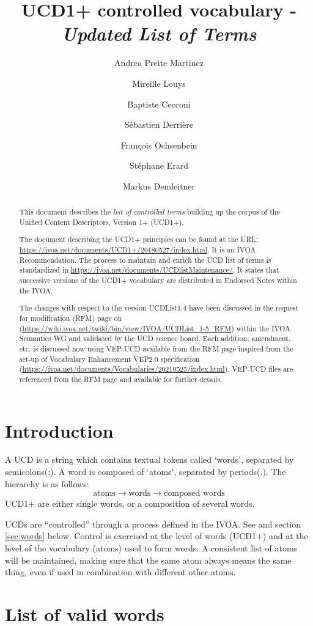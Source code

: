 \documentclass[11pt,a4paper]{ivoa}
\title{UCD1+ controlled vocabulary - \emph{Updated List of Terms}}
\author{Andrea Preite Martinez}
\author{Mireille Louys}
\author{Baptiste Cecconi}
\author{S\'ebastien Derri\`ere}
\author{Fran\c cois Ochsenbein}
\author{St\'ephane Erard}
\author{Markus Demleitner}
\begin{document}
\begin{abstract}
This document describes the \emph{list of controlled terms}  building up the corpus of the Unified Content Descriptors, Version 1+ (UCD1+). 

The document describing the UCD1+ principles can be found at the URL: \url{https://ivoa.net/documents/UCD1+/20180527/index.html}. 
It is an IVOA Recommendation. 
The process to maintain and enrich the UCD list of terms is standardized in  \url{https://ivoa.net/documents/UCDlistMaintenance/}.
It states that successive versions of the UCD1+ vocabulary are distributed in Endorsed Notes within the IVOA.

The changes with respect to the version UCDList1.4 have been discussed in the request for modification (RFM) page on (\url{https://wiki.ivoa.net/twiki/bin/view/IVOA/UCDList_1-5_RFM}) within the IVOA Semantics WG and validated by the UCD science board.
Each addition, amendment, etc.  is discussed now using VEP-UCD available from the RFM page  inspired from the set-up of Vocabulary Enhancement VEP2.0 specification (\url{https://ivoa.net/documents/Vocabularies/20210525/index.html}). 
VEP-UCD files are referenced from the RFM page and available for further details.
\end{abstract} 

\section{Introduction}

A UCD is a string which contains textual tokens called `words', separated by semicolons(;). A word is 
composed of `atoms', separated by periods(.). The hierarchy is as follows: 
$$
\textrm{atoms} \rightarrow \textrm{words} \rightarrow \textrm{composed words}
$$
UCD1+ are either single words, or a composition of several words.

UCDs are ``controlled'' through a process defined in the IVOA. See \citet{2005ivoa.spec.0819D} and 
section \ref{sec:words} below. Control is exercised at the level of words (UCD1+) and at the level 
of the vocabulary (atoms) used to form words. A consistent list of atoms will be maintained, making 
sure that the same atom always means the same thing, even if used in combination with different other 
atoms. 


\section{List of valid words}
\label{sec:list}
\end{document}
